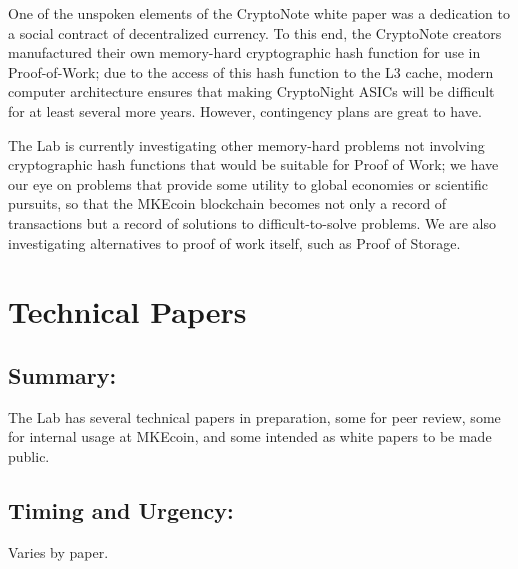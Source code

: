 \documentclass[12pt,english]{mrl}
\theoremstyle{definition}
\numberwithin{equation}{section}
\numberwithin{figure}{section}
\numberwithin{equation}{section}
\numberwithin{equation}{section}
\numberwithin{figure}{section}
\begin{document}
One of the unspoken elements of the CryptoNote white paper was a dedication to a social contract of decentralized currency. To this end, the CryptoNote creators manufactured their own memory-hard cryptographic hash function for use in Proof-of-Work; due to the access of this hash function to the L3 cache, modern computer architecture ensures that making CryptoNight ASICs will be difficult for at least several more years. However, contingency plans are great to have.

The Lab is currently investigating other memory-hard problems not involving cryptographic hash functions that would be suitable for Proof of Work; we have our eye on problems that provide some utility to global economies or scientific pursuits, so that the MKEcoin blockchain becomes not only a record of transactions but a record of solutions to difficult-to-solve problems. We are also investigating alternatives to proof of work itself, such as Proof of Storage.




\section{Technical Papers}

\subsection{Summary:}

The Lab has several technical papers in preparation, some for peer review, some for internal usage at MKEcoin, and some intended as white papers to be made public.

\subsection{Timing and Urgency:}

Varies by paper.
\end{document}
